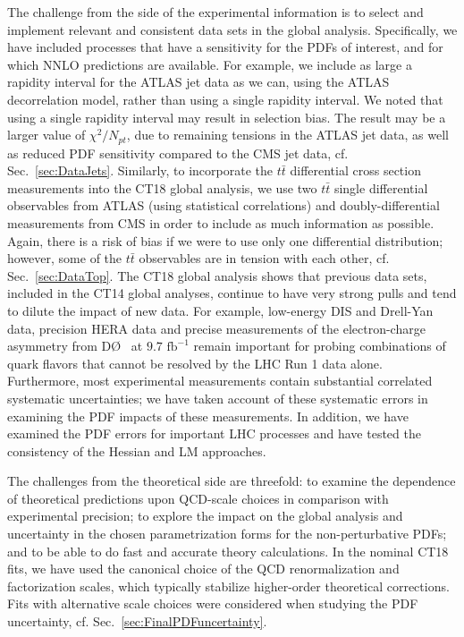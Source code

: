 The challenge from the side of the experimental information is to select and implement relevant and consistent data sets in the global analysis. Specifically, we have included processes that have a sensitivity for the PDFs of interest, and for which NNLO predictions are available. 
For example, we include as large a rapidity interval for the ATLAS jet data as we can, using the ATLAS decorrelation model, rather than using a single rapidity interval. We noted that using a single
rapidity interval may result in selection bias. The result may be a larger value of $\chi^2 / N_\mathit{pt}$, due to remaining tensions in the ATLAS jet data, as well as reduced PDF sensitivity compared
to the CMS jet data, cf. Sec.~\ref{sec:DataJets}.
Similarly, to incorporate the $t \bar t$ differential cross section measurements into the CT18 global analysis,  
we use two $t \bar t$ single differential observables from ATLAS (using statistical correlations) and doubly-differential measurements from CMS in order to include as much information as possible. Again, there is a risk of bias if we were to use only one differential distribution; however, some of the $t\bar t$ observables are in tension with each other, cf. Sec.~\ref{sec:DataTop}.
The CT18 global analysis shows that previous data sets, included in the CT14 global analyses, continue to have very strong pulls and tend to dilute the impact of new data. 
For example, low-energy DIS and Drell-Yan data, precision HERA data and precise measurements of the electron-charge asymmetry from D\O~ at $9.7\mbox{ fb}^{-1}$
\cite{D0:2014kma} remain important for probing combinations of quark flavors that cannot be resolved by the LHC Run 1 data alone. Furthermore, most experimental measurements contain
substantial correlated systematic uncertainties; we have taken account of these systematic errors in examining the PDF impacts of these measurements.
In addition, we have examined the PDF errors for important LHC processes and have tested the consistency of the Hessian and LM approaches.

The challenges from the theoretical side are threefold: to examine the dependence of theoretical predictions upon QCD-scale choices in comparison with experimental precision; to explore the
impact on the global analysis and
uncertainty in the chosen parametrization forms for the non-perturbative PDFs; and to be able to do fast and accurate theory calculations. 
In the nominal CT18 fits, we have used the canonical
choice of the QCD renormalization and factorization scales, which typically stabilize higher-order theoretical corrections. Fits with alternative scale choices were considered when studying the PDF uncertainty, cf. Sec.~\ref{sec:FinalPDFuncertainty}.

